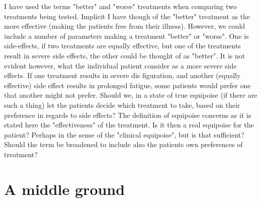 \documentclass[12p]{article}
\begin{document}


I have used the terms "better" and "worse" treatments when comparing two treatments being tested.
Implicit I have though of the "better" treatment as the more effective (making the patients free from their illness).
However, we could include a number of parameters making a treatment "better" or "worse".
One is side-effects, if two treatments are equally effective, but one of the treatments result in severe side effects, the other could be thought of as "better".
It is not evident however, what the individual patient consider as a more severe side effects.
If one treatment results in severe dis figuration, and another (equally effective) side effect results in prolonged fatigue, some patients would prefer one that another might not prefer.
Should we, in a state of true equipoise (if there are such a thing) let the patients decide which treatment to take, based on their preference in regards to side effects?
The definition of equipoise concerns as it is stated here the "effectiveness" of the treatment.
Is it then a real equipoise for the patient?
Perhaps in the sense of the "clinical equipoise", but is that sufficient?
Should the term be broadened to include also the patients own preferences of treatment?


\section*{A middle ground}
\end{document}
